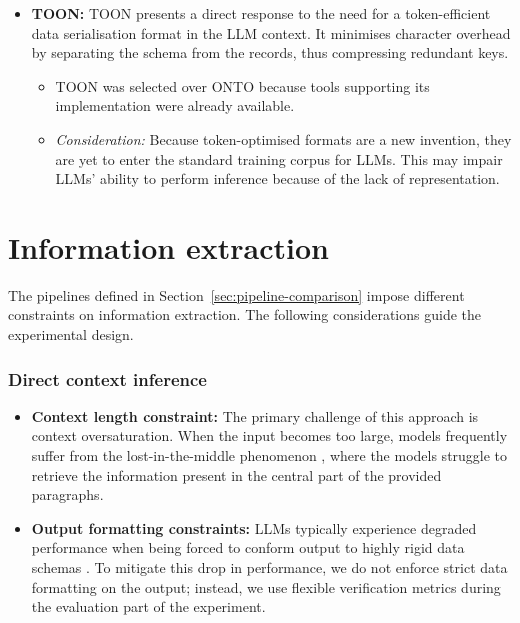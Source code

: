 \begin{itemize}
  \item \textbf{TOON:} TOON presents a direct response to the need for a token-efficient data serialisation
    format in the LLM context. It minimises character overhead by separating the schema from the records,
    thus compressing redundant keys.
    \begin{itemize}
      \item TOON was selected over ONTO because tools supporting its implementation were already available.
      \item \emph{Consideration:} Because token-optimised formats are a new invention, they are yet to enter
        the standard training corpus for LLMs. This may impair LLMs' ability to perform inference because of
        the lack of representation.
    \end{itemize}
\end{itemize}

\section{Information extraction}

The pipelines defined in Section~\ref{sec:pipeline-comparison} impose different constraints on information
extraction. The following considerations guide the experimental design.

\subsubsection{Direct context inference}

\begin{itemize}
  \item \textbf{Context length constraint:} The primary challenge of this approach is context oversaturation.
    When the input becomes too large, models frequently suffer from the lost-in-the-middle phenomenon
    \cite{liu2024lost}, where the models struggle to retrieve the information present in the central part of
    the provided paragraphs.
  \item \textbf{Output formatting constraints:} LLMs typically experience degraded performance when being
    forced to conform output to highly rigid data schemas \cite{tam2024let}. To mitigate this drop in
    performance, we do not enforce strict data formatting on the output; instead, we use flexible
    verification metrics during the evaluation part of the experiment.
\end{itemize}

